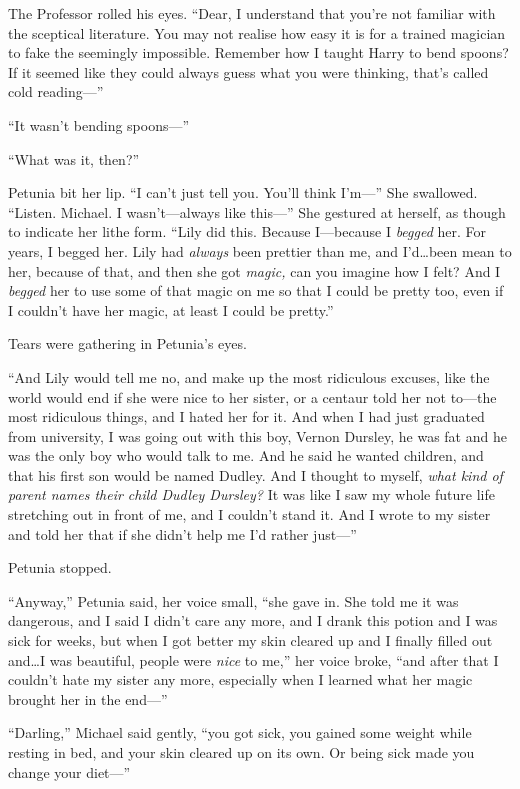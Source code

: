 The Professor rolled his eyes. “Dear, I understand that you’re not familiar with the sceptical literature. You may not realise how easy it is for a trained magician to fake the seemingly impossible. Remember how I taught Harry to bend spoons? If it seemed like they could always guess what you were thinking, that’s called cold reading—”

“It wasn’t bending spoons—”

“What was it, then?”

Petunia bit her lip. “I can’t just tell you. You’ll think I’m—” She swallowed. “Listen. Michael. I wasn’t—always like this—” She gestured at herself, as though to indicate her lithe form. “Lily did this. Because I—because I \emph{begged} her. For years, I begged her. Lily had \emph{always} been prettier than me, and I’d…been mean to her, because of that, and then she got \emph{magic,} can you imagine how I felt? And I \emph{begged} her to use some of that magic on me so that I could be pretty too, even if I couldn’t have her magic, at least I could be pretty.”

Tears were gathering in Petunia’s eyes.

“And Lily would tell me no, and make up the most ridiculous excuses, like the world would end if she were nice to her sister, or a centaur told her not to—the most ridiculous things, and I hated her for it. And when I had just graduated from university, I was going out with this boy, Vernon Dursley, he was fat and he was the only boy who would talk to me. And he said he wanted children, and that his first son would be named Dudley. And I thought to myself, \emph{what kind of parent names their child Dudley Dursley?} It was like I saw my whole future life stretching out in front of me, and I couldn’t stand it. And I wrote to my sister and told her that if she didn’t help me I’d rather just—”

Petunia stopped.

“Anyway,” Petunia said, her voice small, “she gave in. She told me it was dangerous, and I said I didn’t care any more, and I drank this potion and I was sick for weeks, but when I got better my skin cleared up and I finally filled out and…I was beautiful, people were \emph{nice} to me,” her voice broke, “and after that I couldn’t hate my sister any more, especially when I learned what her magic brought her in the end—”

“Darling,” Michael said gently, “you got sick, you gained some weight while resting in bed, and your skin cleared up on its own. Or being sick made you change your diet—”


